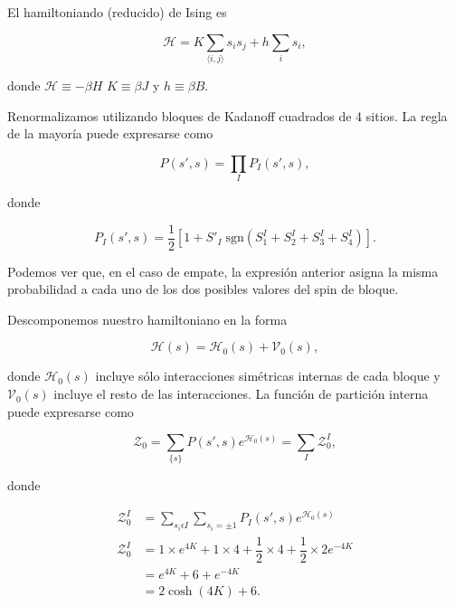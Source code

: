 \documentclass[10pt]{article}
\begin{document}
El hamiltoniando (reducido) de Ising es

\begin{equation}
\mathcal{H} = K \sum_{\langle i, j\rangle} s_i s_j + h \sum_i s_i,
\end{equation}


donde $\mathcal{H} \equiv -\beta H$ $K \equiv \beta J$ y $h \equiv \beta B$.

Renormalizamos utilizando bloques de Kadanoff cuadrados de 4 sitios. La regla de la mayor\'ia puede expresarse como

\begin{equation}
P(s', s) = \prod_I P_I(s',s),
\end{equation}

donde 

\begin{equation}
P_I(s', s) = \dfrac{1}{2} \left[ 1 + S'_I\; \mathrm{sgn}(S_1^I+S_2^I+S_3^I+S_4^I) \right].
\end{equation}

Podemos ver que, en el caso de empate, la expresi\'on anterior asigna la misma probabilidad a cada uno de los dos posibles valores del spin de bloque.

Descomponemos nuestro hamiltoniano en la forma

\begin{equation}
\mathcal{H}(s) = \mathcal{H}_0(s) + \mathcal{V}_0(s),
\end{equation}

donde $\mathcal{H}_0(s)$ incluye s\'olo interacciones sim\'etricas internas de cada bloque y $ \mathcal{V}_0(s)$  incluye el resto de las interacciones.
La funci\'on de partici\'on interna puede expresarse como

\begin{equation}
\mathcal{Z}_0 = \sum_{\lbrace s \rbrace} P(s',s) e^{\mathcal{H}_0(s)} = \sum_I \mathcal{Z}^I_0,
\end{equation}

donde 

\begin{align}
\mathcal{Z}_0^I &= \sum_{s_i\epsilon I} \sum_{s_i=\pm 1} P_I(s',s) e^{\mathcal{H}_0(s)} \nonumber \\
\mathcal{Z}_0^I &= 1\times e^{4K} + 1\times 4 + \dfrac{1}{2}\times 4 + \dfrac{1}{2}\times 2e^{-4K} \nonumber \\
&= e^{4K} + 6 + e^{-4K} \nonumber \\
&= 2 \cosh(4K) + 6.
\end{align}
\end{document}
